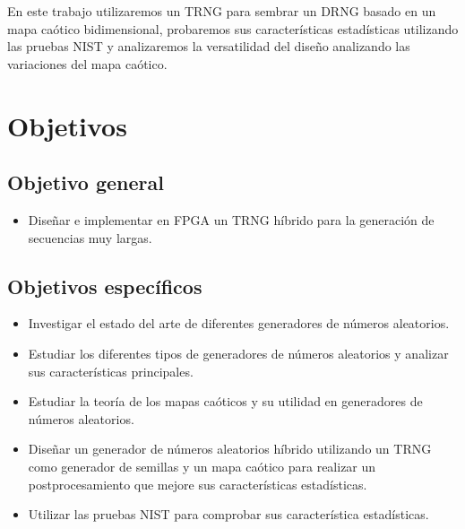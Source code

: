     En este trabajo utilizaremos un TRNG para sembrar un DRNG basado en un mapa caótico bidimensional, probaremos sus características estadísticas utilizando las pruebas NIST y analizaremos la versatilidad del diseño analizando las variaciones del mapa caótico.


    \section{Objetivos}
	
		\subsection{Objetivo general}
			\begin{itemize}
				\item Diseñar e implementar en FPGA un TRNG híbrido para la generación de secuencias muy largas.
			\end{itemize}
		
		\subsection{Objetivos específicos}
			\begin{itemize}
                \item Investigar el estado del arte de diferentes generadores de números aleatorios.
                \item Estudiar los diferentes tipos de generadores de números aleatorios y analizar sus características principales.
                \item Estudiar la teoría de los mapas caóticos y su utilidad en generadores de números aleatorios.
                \item Diseñar un generador de números aleatorios híbrido utilizando un TRNG como generador de semillas y un mapa caótico para realizar un postprocesamiento que mejore sus características estadísticas.
                \item Utilizar las pruebas NIST para comprobar sus característica estadísticas.
			\end{itemize}
